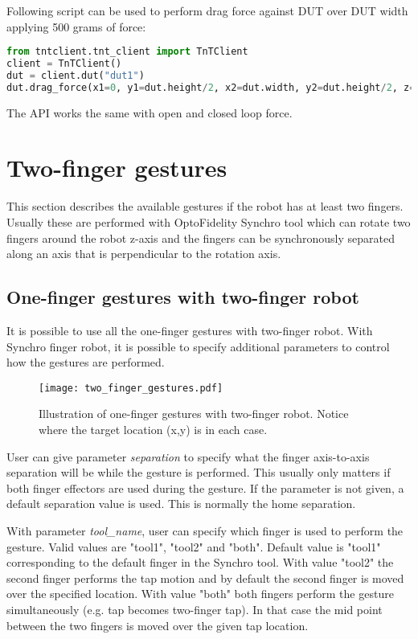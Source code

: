 Following script can be used to perform drag force against DUT over DUT width applying 500 grams of force:

\begin{lstlisting}[language=Python]
from tntclient.tnt_client import TnTClient
client = TnTClient()
dut = client.dut("dut1")
dut.drag_force(x1=0, y1=dut.height/2, x2=dut.width, y2=dut.height/2, z=10, force=500)
\end{lstlisting}

The API works the same with open and closed loop force.

\section{Two-finger gestures}

This section describes the available gestures if the robot has at least two fingers. Usually these are performed with OptoFidelity Synchro tool which can rotate two fingers around the robot z-axis and the fingers can be synchronously separated along an axis that is perpendicular to the rotation axis.

\subsection{One-finger gestures with two-finger robot}

It is possible to use all the one-finger gestures with two-finger robot. With Synchro finger robot, it is possible to specify additional parameters to control how the gestures are performed. 

\begin{figure}[!h]
	\centering
	\texttt{[image: two\_finger\_gestures.pdf]}
	\caption{Illustration of one-finger gestures with two-finger robot. Notice where the target location (x,y) is in each case.}
	\label{fig:two_finger_gestures}
\end{figure}

User can give parameter \emph{separation} to specify what the finger axis-to-axis separation will be while the gesture is performed. This usually only matters if both finger effectors are used during the gesture. If the parameter is not given, a default separation value is used. This is normally the home separation.

With parameter \emph{tool\_name}, user can specify which finger is used to perform the gesture. Valid values are "tool1", "tool2" and "both". Default value is "tool1" corresponding to the default finger in the Synchro tool. With value "tool2" the second finger performs the tap motion and by default the second finger is moved over the specified location. With value "both" both fingers perform the gesture simultaneously (e.g. tap becomes two-finger tap). In that case the mid point between the two fingers is moved over the given tap location.

